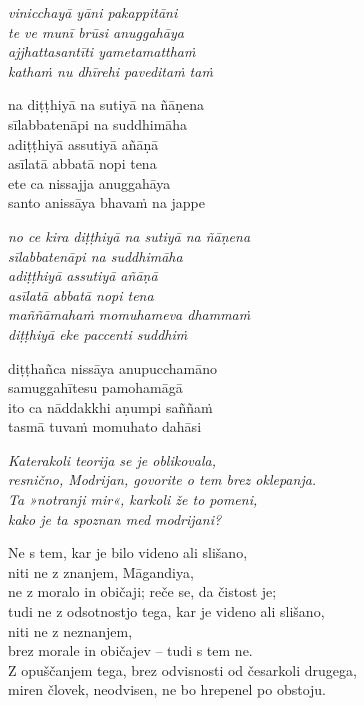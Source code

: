 
\clearpage

\emph{vinicchayā yāni pakappitāni}\\
\emph{te ve munī brūsi anuggahāya}\\
\emph{ajjhattasantīti yametamatthaṁ}\\
\emph{kathaṁ nu dhīrehi paveditaṁ taṁ}

na diṭṭhiyā na sutiyā na ñāṇena\\
sīlabbatenāpi na suddhimāha\\
adiṭṭhiyā assutiyā añāṇā\\
asīlatā abbatā nopi tena\\
ete ca nissajja anuggahāya\\
santo anissāya bhavaṁ na jappe

\emph{no ce kira diṭṭhiyā na sutiyā na ñāṇena}\\
\emph{sīlabbatenāpi na suddhimāha}\\
\emph{adiṭṭhiyā assutiyā añāṇā}\\
\emph{asīlatā abbatā nopi tena}\\
\emph{maññāmahaṁ momuhameva dhammaṁ}\\
\emph{diṭṭhiyā eke paccenti suddhiṁ}

diṭṭhañca nissāya anupucchamāno\\
samuggahītesu pamohamāgā\\
ito ca nāddakkhi aṇumpi saññaṁ\\
tasmā tuvaṁ momuhato dahāsi


\clearpage

\emph{Katerakoli teorija se je oblikovala,\\
resnično, Modrijan, govorite o tem brez oklepanja.\\
Ta »notranji mir«, karkoli že to pomeni,\\
kako je ta spoznan med modrijani?}

Ne s tem, kar je bilo videno ali slišano,\\\vin niti ne z znanjem, Māgandiya,\\
ne z moralo in običaji; reče se, da čistost je;\\
tudi ne z odsotnostjo tega, kar je videno ali slišano,\\\vin niti ne z neznanjem,\\
brez morale in običajev -- tudi s tem ne.\\
Z opuščanjem tega, brez odvisnosti od česarkoli drugega,\\
miren človek, neodvisen, ne bo hrepenel po obstoju.


